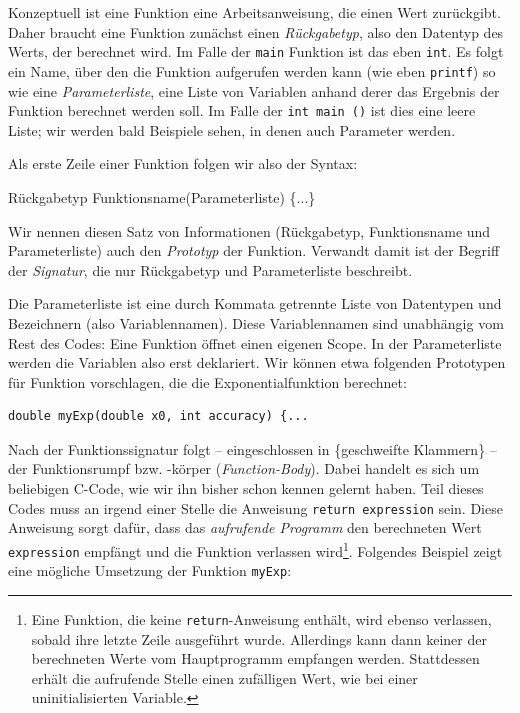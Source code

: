 Konzeptuell ist eine Funktion eine Arbeitsanweisung, die einen Wert zurückgibt. Daher braucht eine Funktion zunächst einen \emph{Rückgabetyp}, also den Datentyp des Werts, der berechnet wird. Im Falle der \texttt{main} Funktion ist das eben \texttt{int}. Es folgt ein Name, über den die Funktion aufgerufen werden kann (wie eben \texttt{printf}) so wie eine \emph{Parameterliste}, \ie eine Liste von Variablen anhand derer \eg das Ergebnis der Funktion berechnet werden soll. Im Falle der \texttt{int main ()} ist dies eine leere Liste; wir werden bald Beispiele sehen, in denen auch Parameter werden.

Als erste Zeile einer Funktion folgen wir also der Syntax:
\begin{codebox}
Rückgabetyp Funktionsname(Parameterliste) \{...\}
\end{codebox}
Wir nennen diesen Satz von Informationen (Rückgabetyp, Funktionsname und Parameterliste) auch den \emph{Prototyp} der Funktion. Verwandt damit ist der Begriff der \emph{Signatur}, die nur Rückgabetyp und Parameterliste beschreibt.

Die Parameterliste ist eine durch Kommata getrennte Liste von Datentypen und Bezeichnern (also Variablennamen). Diese Variablennamen sind unabhängig vom Rest des Codes: Eine Funktion öffnet einen eigenen Scope. In der Parameterliste werden die Variablen also erst deklariert. Wir können etwa folgenden Prototypen für Funktion vorschlagen, die die Exponentialfunktion berechnet:

\begin{codebox}
\begin{verbatim}
double myExp(double x0, int accuracy) {...
\end{verbatim}
\end{codebox}

Nach der Funktionssignatur folgt -- eingeschlossen in \{geschweifte Klammern\} -- der Funktionsrumpf bzw. -körper (\emph{Function-Body}). Dabei handelt es sich um beliebigen C-Code, wie wir ihn bisher schon kennen gelernt haben. Teil dieses Codes muss an irgend einer Stelle die Anweisung \texttt{return expression} sein. Diese Anweisung sorgt dafür, dass das \emph{aufrufende Programm} den berechneten Wert \texttt{expression} empfängt und die Funktion verlassen wird\footnote{Eine Funktion, die keine \texttt{return}-Anweisung enthält, wird ebenso verlassen, sobald ihre letzte Zeile ausgeführt wurde. Allerdings kann dann keiner der berechneten Werte vom Hauptprogramm empfangen werden. Stattdessen erhält die aufrufende Stelle einen zufälligen Wert, wie bei einer uninitialisierten Variable.}. Folgendes Beispiel zeigt eine mögliche Umsetzung der Funktion \texttt{myExp}:

